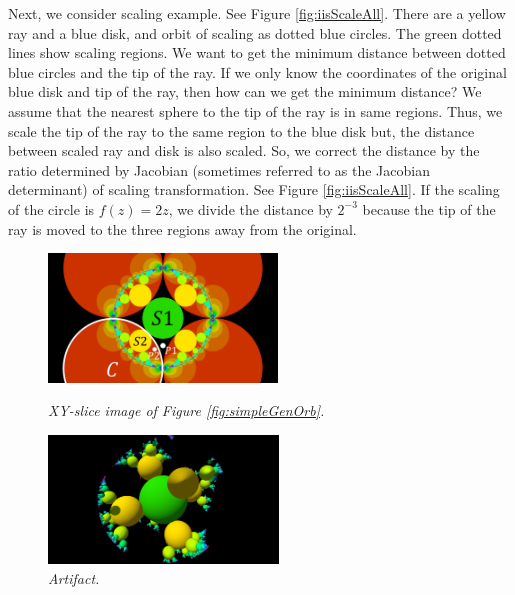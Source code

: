 Next, we consider scaling example.
See Figure \ref{fig:iisScaleAll}.
There are a yellow ray and a blue disk, and orbit of scaling as
dotted blue circles.
The green dotted lines show scaling regions.
We want to get the minimum distance between dotted blue circles and the
tip of the ray.
If we only know the coordinates of the original blue
disk and tip of the ray, then how can we get the minimum distance?
We assume that the nearest sphere to the tip of the ray is in
same regions. 
Thus, we scale the tip of the ray to the same region to the blue disk
but, the distance between scaled ray and disk is also scaled.
So, we correct the distance by the ratio determined by Jacobian
(sometimes referred to as the Jacobian determinant) of scaling transformation.
See Figure \ref{fig:iisScaleAll}.
If the scaling of the circle is $f(z) = 2z$, we divide the distance by
$2^{-3}$ because the tip of the ray is moved to the three regions away
from the original.

\begin{figure}[htbp]
 \begin{minipage}[t]{0.5\hsize}
  \center
  \includegraphics[height=1.35in, keepaspectratio]{img/preparation/slice.png}
  \caption{\textit{XY-slice image of Figure \ref{fig:simpleGenOrb}.}}
  \label{fig:slice2d}
  \hspace*{\fill}
 \end{minipage}
 \begin{minipage}[t]{0.5\hsize}
  \center
  \includegraphics[height=1.35in, keepaspectratio]{img/preparation/artifact.pdf}
  \caption{\textit{Artifact.}}
  \label{fig:3dartifact}
  \hspace*{\fill}
 \end{minipage}
\end{figure}

